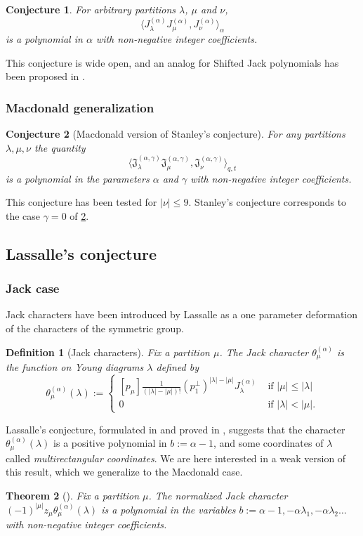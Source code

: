 \documentclass[12pt]{amsart}
\newtheorem{thm}{Theorem}[section]
\newtheorem{defi}[thm]{Definition}
\newtheorem{conj}{Conjecture}
\theoremstyle{remark}
\newcommand{\Jch}{\theta^{(\alpha)}}
\newcommand{\JJack}{{\mathfrak J}^{(\alpha,\gamma)}}
\begin{document}
\begin{conj}\cite{Stanley1989}
    For arbitrary partitions $\lambda$, $\mu$ and $\nu$, 
     $$\langle J^{(\alpha)}_\lambda J^{(\alpha)}_\mu,J^{(\alpha)}_\nu\rangle_{\alpha}$$
is a polynomial in $\alpha$ with non-negative integer coefficients.
\end{conj}
This conjecture is wide open, and an analog for Shifted Jack polynomials has been proposed in \cite{AlexanderssonFeray19}.
\subsubsection{Macdonald generalization}
\begin{conj}[Macdonald version of Stanley's conjecture]\label{conj Stanley-Macdonald}
    For any partitions $\lambda, \mu,\nu$ the quantity
    $$\langle\JJack_\lambda\JJack_\mu,\JJack_\nu\rangle_{q,t}$$
    is a polynomial in the parameters $\alpha$ and $\gamma$ with non-negative integer coefficients.
\end{conj}
This conjecture has been tested for $|\nu|\leq 9$. Stanley's conjecture corresponds to the case $\gamma=0$ of \cref{conj Stanley-Macdonald}. 

\subsection{Lassalle's conjecture}\label{sec Lassalle conjecture}
\subsubsection{Jack case}
Jack characters have been introduced by Lassalle \cite{Lassalle2008b} as a one parameter deformation of the characters of the symmetric group.
\begin{defi}[Jack characters]Fix a partition $\mu$. The Jack character $\theta^{(\alpha)}_\mu$ is the function on Young diagrams $\lambda$ defined by 
    $$ \theta^{(\alpha)}_\mu(\lambda):=\left\{
    \begin{array}{ll}
    \left[p_\mu\right]\frac{1}{(|\lambda|-|\mu|)!}(p_1^\perp)^{|\lambda|-|\mu|}J^{(\alpha)}_\lambda &  \mbox{ if $|\mu|\leq|\lambda|$}\\
       0 & \mbox{ if } |\lambda|<|\mu|.
        \end{array}
\right.$$
\end{defi}

Lassalle's conjecture, formulated in \cite{Lassalle2008b} and proved in \cite{BenDaliDolega2023}, suggests that the character $\Jch_\mu(\lambda)$ is a positive polynomial in $b:=\alpha-1$, and some coordinates of $\lambda$ called \textit{multirectangular coordinates}. We are here interested in a weak version of this result, which we generalize to the Macdonald case.
\begin{thm}[\cite{BenDaliDolega2023}]
Fix a partition $\mu$. The normalized Jack character $(-1)^{|\mu|}z_\mu\Jch_\mu(\lambda)$  is a polynomial in the variables $b:=\alpha-1,-\alpha \lambda_1,-\alpha \lambda_2\dots$ with non-negative integer coefficients.  
\end{thm}
\end{document}
